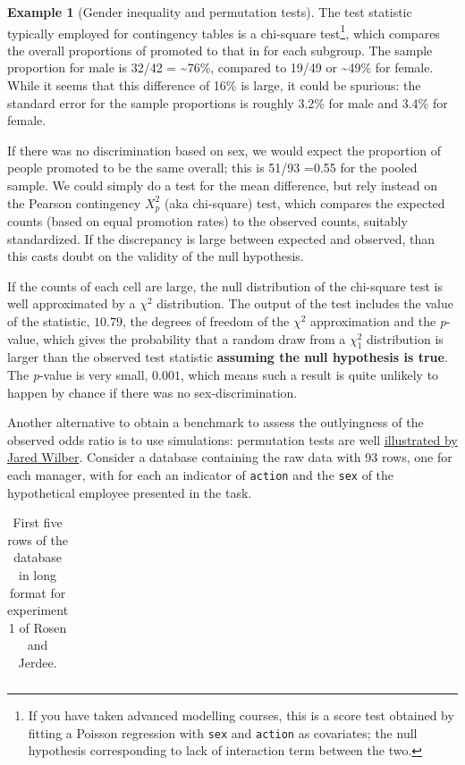 \documentclass[
  11pt,
  letterpaper,
]{scrbook}
\theoremstyle{definition}
\newtheorem{example}{Example}[chapter]
\theoremstyle{definition}
\theoremstyle{remark}
\begin{document}
\begin{example}[Gender inequality and permutation
tests]
The test statistic typically employed for contingency tables is a
chi-square test\footnote{If you have taken advanced modelling courses,
  this is a score test obtained by fitting a Poisson regression with
  \texttt{sex} and \texttt{action} as covariates; the null hypothesis
  corresponding to lack of interaction term between the two.}, which
compares the overall proportions of promoted to that in for each
subgroup. The sample proportion for male is 32/42 = \textasciitilde76\%,
compared to 19/49 or \textasciitilde49\% for female. While it seems that
this difference of 16\% is large, it could be spurious: the standard
error for the sample proportions is roughly 3.2\% for male and 3.4\% for
female.

If there was no discrimination based on sex, we would expect the
proportion of people promoted to be the same overall; this is 51/93
=0.55 for the pooled sample. We could simply do a test for the mean
difference, but rely instead on the Pearson contingency \(X^2_p\) (aka
chi-square) test, which compares the expected counts (based on equal
promotion rates) to the observed counts, suitably standardized. If the
discrepancy is large between expected and observed, than this casts
doubt on the validity of the null hypothesis.

If the counts of each cell are large, the null distribution of the
chi-square test is well approximated by a \(\chi^2\) distribution. The
output of the test includes the value of the statistic, \(10.79\), the
degrees of freedom of the \(\chi^2\) approximation and the
\emph{p}-value, which gives the probability that a random draw from a
\(\chi^2_1\) distribution is larger than the observed test statistic
\textbf{assuming the null hypothesis is true}. The \emph{p}-value is
very small, \(0.001\), which means such a result is quite unlikely to
happen by chance if there was no sex-discrimination.

Another alternative to obtain a benchmark to assess the outlyingness of
the observed odds ratio is to use simulations: permutation tests are
well \href{https://www.jwilber.me/permutationtest/}{illustrated by Jared
Wilber}. Consider a database containing the raw data with 93 rows, one
for each manager, with for each an indicator of \texttt{action} and the
\texttt{sex} of the hypothetical employee presented in the task.

\begin{longtable}[t]{ll}

\caption{\label{tbl-dat-long-test-rosen-print}First five rows of the
database in long format for experiment 1 of Rosen and Jerdee.}


\end{longtable}
\end{example}
\end{document}
